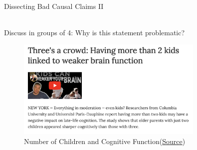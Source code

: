 \documentclass[11pt]{beamer}
\begin{document}
\begin{frame}{Dissecting Bad Causal Claims II}

   \begin{alertblock} {\centering \vspace{-1.5ex} \\ Discuss in groups of 4: Why is this statement problematic?  \\ \vspace{-1.5ex} } \end{alertblock}

\begin{figure}[h!t]
    \centering    \includegraphics[width=0.8\textwidth]{figures/s1_brains.png}
    \caption{Number of Children and Cognitive Function(\href{https://studyfinds.org/too-many-kids-harmful-brain/
}{Source})}
    \label{fig:brain}
\end{figure}

\end{frame}
\end{document}
